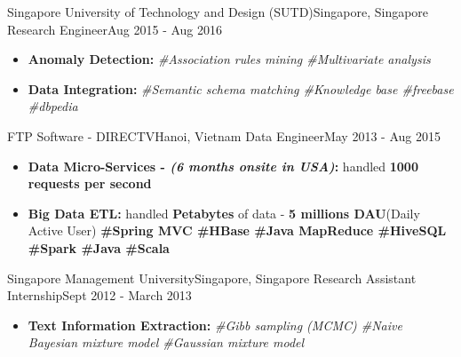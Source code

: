 
\resumeSubheading
{Singapore University of Technology and Design (SUTD)}{Singapore, Singapore}
{Research Engineer}{Aug 2015 - Aug 2016}
\begin{itemize}
    \item \textbf{Anomaly Detection:} \emph{\#Association rules mining \#Multivariate analysis}
    \item \textbf{Data Integration:} \emph{\#Semantic schema matching \#Knowledge base \#freebase \#dbpedia}
\end{itemize}


\resumeSubheading
{FTP Software - DIRECTV}{Hanoi, Vietnam}
{Data Engineer}{May 2013 - Aug 2015}
\begin{itemize}
    \item \textbf{Data Micro-Services - \emph{(6 months onsite in USA)}:} handled \textbf{1000 requests per second}
    \item \textbf{Big Data ETL:} handled \textbf{Petabytes} of data - \textbf{5 millions DAU}(Daily Active User)
    \textbf{\scriptsize{\#Spring MVC \#HBase \#Java MapReduce \#HiveSQL \#Spark \#Java \#Scala}}
\end{itemize}


\resumeSubheading
{Singapore Management University}{Singapore, Singapore}
{Research Assistant Internship}{Sept 2012 - March 2013}
\begin{itemize}
    \item \textbf{Text Information Extraction:} \emph{\#Gibb sampling (MCMC) \#Naive Bayesian mixture model \#Gaussian mixture model}
\end{itemize}

